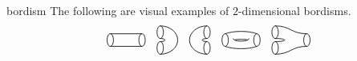 \begin{example}{bordism}
    The following are visual examples of $2$-dimensional bordisms.
    \[ \svg \begin{tikzpicture}[semithick, scale=0.5, baseline=-0.5ex] \begin{scope} \draw (-1,0) ellipse (0.2cm and 0.4cm); \draw (-1,0.4) -- (1,0.4); \draw (-1,-0.4) -- (1,-0.4); \draw (1,0) ellipse (0.2cm and 0.4cm); \end{scope} \end{tikzpicture}
        \quad
        \begin{tikzpicture}[semithick, scale=0.5, baseline=-0.5ex] \begin{scope} \draw (0,0.5) ellipse (0.2cm and 0.4cm); \draw (0,-0.5) ellipse (0.2cm and 0.4cm); \draw (0,0.9) arc (90:-90:1.1cm and 0.9cm); \draw (0,0.1) arc (90:-90:0.3cm and 0.1cm); \end{scope} \end{tikzpicture}
        \quad
        \begin{tikzpicture}[semithick, scale=0.5, baseline=-0.5ex] \begin{scope} \draw (0,0.5) ellipse (0.2cm and 0.4cm);\draw (0,-0.5) ellipse (0.2cm and 0.4cm); \draw (0,0.9) arc (90:270:1.1cm and 0.9cm); \draw (0,0.1) arc (90:270:0.3cm and 0.1cm); \end{scope} \end{tikzpicture}
        \quad
        \begin{tikzpicture}[semithick, scale=0.5, baseline=-0.5ex] \begin{scope} \draw (-1,0) ellipse (0.2cm and 0.4cm); \draw (-1,0.4) .. controls (-0.5,0.6) and (0.5,0.6) .. (1,0.4); \draw (-1,-0.4) .. controls (-0.5,-0.6) and (0.5,-0.6) .. (1,-0.4); \draw (-0.5,0.1) .. controls (-0.5,-0.125) and (0.5,-0.125) .. (0.5,0.1); \draw (-0.4,0.0) .. controls (-0.4,0.0625) and (0.4,0.0625) .. (0.4,0.0); \draw (1,0) ellipse (0.2cm and 0.4cm); \end{scope} \end{tikzpicture}
        \quad
        \begin{tikzpicture}[semithick, scale=0.5, baseline=-0.5ex] \begin{scope} \draw (-1,0.5) ellipse (0.2cm and 0.4cm); \draw (-1,-0.5) ellipse (0.2cm and 0.4cm); \draw (1,0) ellipse (0.2cm and 0.4cm); \draw (-1,0.9) .. controls (0,0.9) and (0,0.4) .. (1,0.4); \draw (-1,-0.9) .. controls (0,-0.9) and (0,-0.4) .. (1,-0.4); \draw (-1,0.1) .. controls (-0.2,0.1) and (-0.2,-0.1) .. (-1,-0.1); \end{scope} \end{tikzpicture}
\]
\end{example}
